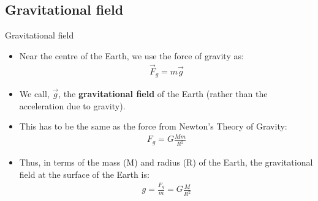 \documentclass[aspectratio=169,
hyperref={colorlinks,urlcolor=blue}
]{beamer}
\begin{document}
\subsection{Gravitational field}
\label{subsec:gravitationalfield}
\begin{frame}{Gravitational field}
\begin{itemize}
\item Near the centre of the Earth, we use the force of gravity as:
\begin{align*}
\vec F_g=m\vec g
\end{align*}
\item We call, $\vec g$, the \textbf{gravitational field} of the Earth (rather than the acceleration due to gravity).
\item This has to be the same as the force from Newton's Theory of Gravity:
\begin{align*}
F_g=G\frac{Mm}{R^2}
\end{align*}
\item Thus, in terms of the mass (M) and radius (R) of the Earth, the gravitational field at the surface of the Earth is:
\begin{align*}
g=\frac{F_g}{m}=G\frac{M}{R^2}
\end{align*}
\end{itemize}
\end{frame}
\end{document}

